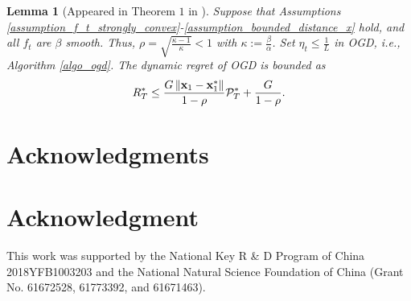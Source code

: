 \documentclass[journal]{IEEEtran}
\newtheorem{Lemma}{\bf{Lemma}}
\begin{document}
\begin{Lemma}[Appeared in Theorem $1$ in \cite{Mokhtari:2016jz} ]
\label{lemma_strongly_convex_regret}
Suppose that Assumptions \ref{assumption_f_t_strongly_convex}-\ref{assumption_bounded_distance_x} hold, and all $f_t$ are $\beta$ smooth. Thus, $\rho = \sqrt{\frac{\kappa-1}{\kappa}} <1$ with $\kappa := \frac{\beta}{\alpha}$. Set $\eta_t \le \frac{1}{L}$ in OGD, i.e., Algorithm \ref{algo_ogd}. The dynamic regret of OGD is bounded as
\begin{align}
\nonumber
R_T^{\ast} \le \frac{G\left\lVert{\bf x}_1-{\bf x}_1^{\ast}\right\rVert}{1-\rho} {\mathcal{P}}_T^{\ast} + \frac{G}{1-\rho}.
\end{align}

\end{Lemma}













\ifCLASSOPTIONcompsoc
  \section*{Acknowledgments}
\else
  \section*{Acknowledgment}
\fi


This work was supported by the National Key R \& D Program of China 2018YFB1003203 and the National Natural Science Foundation of China (Grant No. 61672528, 61773392, and 61671463). 

\ifCLASSOPTIONcaptionsoff
  \newpage
\fi


\balance


\end{document}

